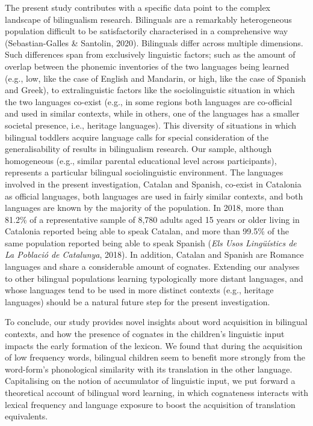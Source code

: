 \documentclass[
  12pt,
  b5paperpaper,
  twoside]{scrreprt}
\begin{document}
The present study contributes with a specific data point to the complex
landscape of bilingualism research. Bilinguals are a remarkably
heterogeneous population difficult to be satisfactorily characterised in
a comprehensive way (Sebastian-Galles \& Santolin, 2020). Bilinguals
differ across multiple dimensions. Such differences span from
exclusively linguistic factors; such as the amount of overlap between
the phonemic inventories of the two languages being learned (e.g., low,
like the case of English and Mandarin, or high, like the case of Spanish
and Greek), to extralinguistic factors like the sociolinguistic
situation in which the two languages co-exist (e.g., in some regions
both languages are co-official and used in similar contexts, while in
others, one of the languages has a smaller societal presence, i.e.,
heritage languages). This diversity of situations in which bilingual
toddlers acquire language calls for special consideration of the
generalisability of results in bilingualism research. Our sample,
although homogeneous (e.g., similar parental educational level across
participants), represents a particular bilingual sociolinguistic
environment. The languages involved in the present investigation,
Catalan and Spanish, co-exist in Catalonia as official languages, both
languages are used in fairly similar contexts, and both languages are
known by the majority of the population. In 2018, more than 81.2\% of a
representative sample of 8,780 adults aged 15 years or older living in
Catalonia reported being able to speak Catalan, and more than 99.5\% of
the same population reported being able to speak Spanish (\emph{Els Usos
Ling{ü}{í}stics de La Poblaci{ó} de Catalunya}, 2018). In addition,
Catalan and Spanish are Romance languages and share a considerable
amount of cognates. Extending our analyses to other bilingual
populations learning typologically more distant languages, and whose
languages tend to be used in more distinct contexts (e.g., heritage
languages) should be a natural future step for the present
investigation.

To conclude, our study provides novel insights about word acquisition in
bilingual contexts, and how the presence of cognates in the children's
linguistic input impacts the early formation of the lexicon. We found
that during the acquisition of low frequency words, bilingual children
seem to benefit more strongly from the word-form's phonological
similarity with its translation in the other language. Capitalising on
the notion of accumulator of linguistic input, we put forward a
theoretical account of bilingual word learning, in which cognateness
interacts with lexical frequency and language exposure to boost the
acquisition of translation equivalents.
\end{document}
